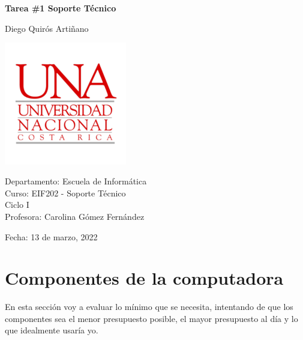 \documentclass[12pt, a4paper, twocolumn]{article}
\begin{document}
\begin{titlepage}
    \begin{flushleft}
        \textbf{\Large Tarea \#1 Soporte Técnico}
        \newline

        \large Diego Quirós Artiñano \\
        
        \vfill
        
        \includegraphics[width=0.4\textwidth]{UNA.png}

        Departamento: Escuela de Informática \\
        Curso: EIF202 - Soporte Técnico \\
        Ciclo I \\
        Profesora: Carolina Gómez Fernández \newline

        Fecha: 13 de marzo, 2022
    \end{flushleft}
\end{titlepage}
\section{Componentes de la computadora}
\balance
En esta sección voy a evaluar lo mínimo que se necesita, intentando de que los componentes sea el menor presupuesto posible, el mayor presupuesto al día y lo que idealmente usaría yo.
\end{document}
